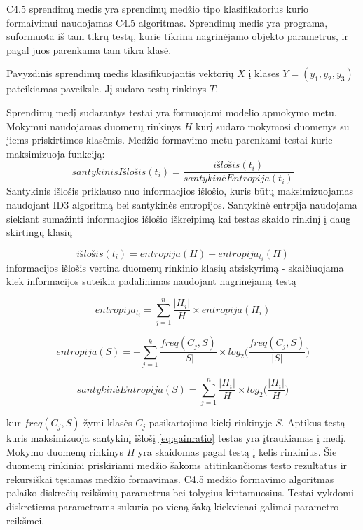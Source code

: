 C4.5 sprendimų medis yra sprendimų medžio tipo klasifikatorius kurio formaivimui naudojamas C4.5 algoritmas. Sprendimų medis yra programa, suformuota iš tam tikrų testų, kurie tikrina nagrinėjamo objekto parametrus, ir pagal juos parenkama tam tikra klasė.


Pavyzdinis sprendimų medis klasifikuojantis vektorių $X$ į klases $Y = (y_1, y_2, y_3)$ pateikiamas  paveiksle. Jį sudaro testų rinkinys $T$.

Sprendimų medį sudarantys testai yra formuojami modelio apmokymo metu. Mokymui naudojamas duomenų rinkinys $H$ kurį sudaro mokymosi duomenys su jiems priskirtimos klasėmis. Medžio formavimo metu parenkami testai kurie maksimizuoja funkciją:
\begin{equation} \label{eq:gainratio}
    santykinisIšlošis(t_i) = \frac{išlošis(t_i)}{santykinėEntropija(t_i)}
\end{equation}
Santykinis išlošis priklauso nuo informacjios išlošio, kuris būtų maksimizuojamas naudojant ID3 algoritmą bei santykinės entropijos. Santykinė entrpija naudojama siekiant sumažinti informacjios išlošio iškreipimą kai testas skaido rinkinį į daug skirtingų klasių \cite{c45}

\begin{equation}
    išlošis(t_i) = entropija(H) - entropija_{t_i}(H)
\end{equation}
informacijos išlošis vertina duomenų rinkinio klasių atsiskyrimą - skaičiuojama kiek informacijos suteikia padalinimas naudojant nagrinėjamą testą

\begin{equation}
    entropija_{t_i} = \sum_{j=1}^{n} \frac{|H_i|}{H} \times entropija(H_i)
\end{equation}

\begin{equation}
    entropija(S) = - \sum_{j=1}^{k} \frac{freq(C_j, S)}{|S|} \times log_2 \big( \frac{freq(C_j, S)}{|S|} \big)
\end{equation}

\begin{equation}
    santykinėEntropija(S) =  \sum_{j=1}^{n} \frac{|H_i|}{H} \times log_2 \big( \frac{|H_i|}{H} \big)
\end{equation}

kur $freq(C_j, S)$ žymi klasės $C_j$ pasikartojimo kiekį rinkinyje $S$.
Aptikus testą kuris maksimizuoja santykinį išlošį \ref{eq:gainratio} testas yra įtraukiamas į medį. Mokymo duomenų rinkinys $H$ yra skaidomas pagal testą į kelis rinkinius\cite{c45}. Šie duomenų rinkiniai priskiriami medžio šakoms atitinkančioms testo rezultatus ir rekursiškai tęsiamas medžio formavimas.
C4.5 medžio formavimo algoritmas palaiko diskrečių reikšmių parametrus bei tolygius kintamuosius. Testai vykdomi diskretiems parametrams sukuria po vieną šaką kiekvienai galimai parametro reikšmei.

